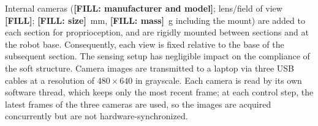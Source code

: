 Internal cameras (\textbf{[FILL: manufacturer and model]}; lens/field of view \textbf{[FILL]}; \textbf{[FILL: size]}~mm, \textbf{[FILL: mass]}~g including the mount) are added to each section for proprioception, and are rigidly mounted between sections and at the robot base. Consequently, each view is fixed relative to the base of the subsequent section. The sensing setup has negligible impact on the compliance of the soft structure. Camera images are transmitted to a laptop via three USB cables at a resolution of $480 \times 640$ in grayscale. Each camera is read by its own software thread, which keeps only the most recent frame; at each control step, the latest frames of the three cameras are used, so the images are acquired concurrently but are not hardware-synchronized.
